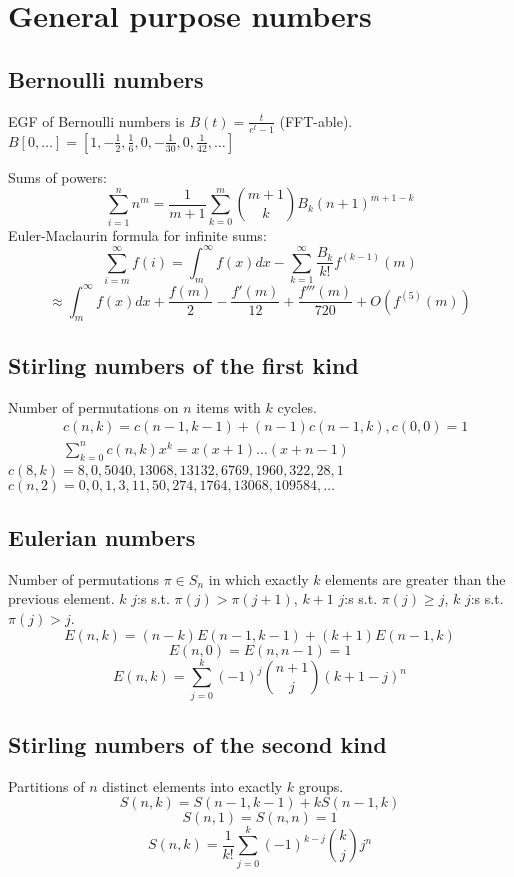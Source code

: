 \section{General purpose numbers}

\subsection{Bernoulli numbers}
	EGF of Bernoulli numbers is $B(t)=\frac{t}{e^t-1}$ (FFT-able).
	$B[0,\ldots] = [1, -\frac{1}{2}, \frac{1}{6}, 0, -\frac{1}{30}, 0, \frac{1}{42}, \ldots]$

	Sums of powers:
	\small
	\[ \sum_{i=1}^n n^m = \frac{1}{m+1} \sum_{k=0}^m \binom{m+1}{k} B_k (n+1)^{m+1-k} \]
	\normalsize
	Euler-Maclaurin formula for infinite sums:
	\small
	\[ \sum_{i=m}^{\infty} f(i) = \int_m^\infty f(x) dx - \sum_{k=1}^\infty \frac{B_k}{k!}f^{(k-1)}(m) \]
	\[ \approx \int_{m}^\infty f(x)dx + \frac{f(m)}{2} - \frac{f'(m)}{12} + \frac{f'''(m)}{720} + O(f^{(5)}(m)) \]
	\normalsize

\subsection{Stirling numbers of the first kind}
	Number of permutations on $n$ items with $k$ cycles.
	\begin{align*}
		&c(n,k) = c(n-1,k-1) + (n-1) c(n-1,k), c(0,0) = 1\\
		&\textstyle \sum_{k=0}^n c(n,k)x^k = x(x+1) \dots (x+n-1)
	\end{align*}
	$c(8,k) = 8, 0, 5040, 13068, 13132, 6769, 1960, 322, 28, 1$ 
	$c(n,2) = 0, 0, 1, 3, 11, 50, 274, 1764, 13068, 109584, \dots$

\subsection{Eulerian numbers}
	Number of permutations $\pi \in S_n$ in which exactly $k$ elements are greater than the previous element. $k$ $j$:s s.t. $\pi(j)>\pi(j+1)$, $k+1$ $j$:s s.t. $\pi(j)\geq j$, $k$ $j$:s s.t. $\pi(j)>j$.
	$$E(n,k) = (n-k)E(n-1,k-1) + (k+1)E(n-1,k)$$
	$$E(n,0) = E(n,n-1) = 1$$
	$$E(n,k) = \sum_{j=0}^k(-1)^j\binom{n+1}{j}(k+1-j)^n$$

\subsection{Stirling numbers of the second kind}
	Partitions of $n$ distinct elements into exactly $k$ groups.
	$$S(n,k) = S(n-1,k-1) + k S(n-1,k)$$
	$$S(n,1) = S(n,n) = 1$$
	$$S(n,k) = \frac{1}{k!}\sum_{j=0}^k (-1)^{k-j}\binom{k}{j}j^n$$

